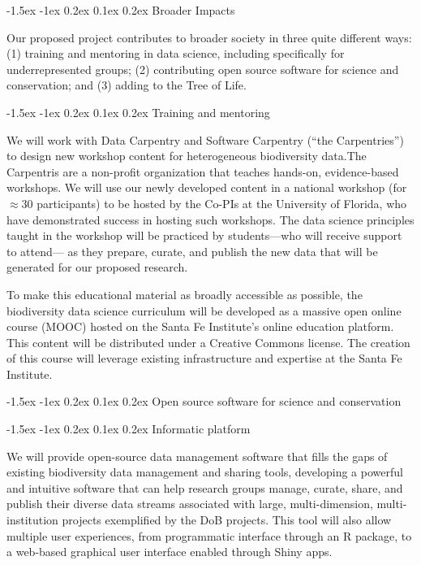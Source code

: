 \documentclass[11pt]{article}
\makeatletter
\renewcommand\section{\@startsection{section}{1}{\z@}%
                                  {-1.5ex \@plus -1ex \@minus 0.2ex}%
                                  {0.1ex \@plus 0.2ex}%
                                  {\normalfont\Large\bfseries}}
\renewcommand\subsection{\@startsection{subsection}{1}{\z@}%
                                  {-1.5ex \@plus -1ex \@minus 0.2ex}%
                                  {0.1ex \@plus 0.2ex}%
                                  {\normalfont\large\bfseries}}
\renewcommand\subsubsection{\@startsection{subsection}{1}{\z@}%
                                  {-1.5ex \@plus -1ex \@minus 0.2ex}%
                                  {0.1ex \@plus 0.2ex}%
                                  {\normalfont\bfseries}}
\makeatother
\begin{document}
\section{Broader Impacts}\label{broader-impacts}

Our proposed project contributes to broader society in three quite
different ways: (1) training and mentoring in data science, including
specifically for underrepresented groups; (2) contributing open source
software for science and conservation; and (3) adding to the Tree of
Life.

\subsection{Training and mentoring}\label{training-and-mentoring}

We will work with Data Carpentry and Software Carpentry (``the
Carpentries'') to design new workshop content for heterogeneous
biodiversity data.The Carpentris are a non-profit organization that
teaches hands-on, evidence-based workshops. We will use our newly
developed content in a national workshop (for $\approx 30$
participants) to be hosted by the Co-PIs at the University of Florida,
who have demonstrated success in hosting such workshops. The data
science principles taught in the workshop will be practiced by
students---who will receive support to attend--- as they prepare,
curate, and publish the new data that will be generated for our
proposed research.

To make this educational material as broadly accessible as possible,
the biodiversity data science curriculum will be developed as a
massive open online course (MOOC) hosted on the Santa Fe Institute's
online education platform. This content will be distributed under a
Creative Commons license. The creation of this course will leverage
existing infrastructure and expertise at the Santa Fe Institute.

\subsection{Open source software for science and conservation}\label{open-source-software}

\subsubsection{Informatic platform}\label{informatic-platform}

We will provide open-source data management software that fills the
gaps of existing biodiversity data management and sharing tools,
developing a powerful and intuitive software that can help research
groups manage, curate, share, and publish their diverse data streams
associated with large, multi-dimension, multi-institution projects
exemplified by the DoB projects. This tool will also allow multiple
user experiences, from programmatic interface through an R package, to
a web-based graphical user interface enabled through Shiny apps.
\end{document}
